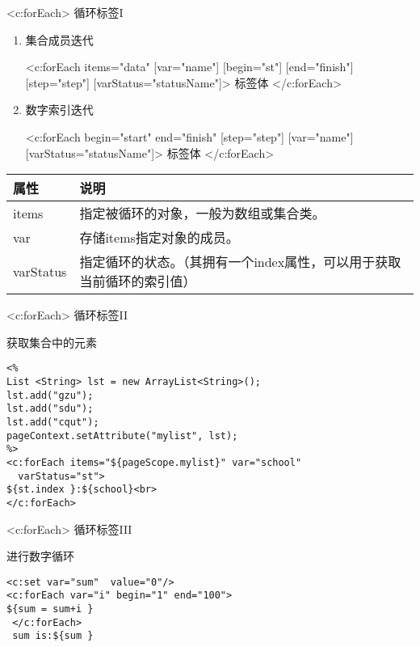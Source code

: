 \documentclass{beamer}
\begin{document}
\begin{frame}{<c:forEach> 循环标签I}
\begin{enumerate}
\item
\label{coll}
集合成员迭代

<c:forEach items="data" [var="name"] [begin="st"] 
 [end="finish"] [step="step"] [varStatus="statusName"]>
 标签体
 </c:forEach>
 \item
 \label{num}
 数字索引迭代
 
 <c:forEach begin="start" end="finish" [step="step"]
  [var="name"] [varStatus="statusName"]>
 标签体
 </c:forEach>

\end{enumerate}
\begin{table}
\begin{tabular}{lp{24em}}
\toprule
\textbf{属性}&\textbf{说明}\\
\midrule
items&指定被循环的对象，一般为数组或集合类。\\
var&存储items指定对象的成员。\\
varStatus&指定循环的状态。（其拥有一个index属性，可以用于获取当前循环的索引值）\\
\bottomrule
\end{tabular}
\end{table}
\end{frame}
\begin{frame}[fragile]{<c:forEach> 循环标签II}
\begin{block}{获取集合中的元素}
\begin{lstlisting}
<%
List <String> lst = new ArrayList<String>();
lst.add("gzu");
lst.add("sdu");
lst.add("cqut");
pageContext.setAttribute("mylist", lst);
%>
<c:forEach items="${pageScope.mylist}" var="school"
  varStatus="st">
${st.index }:${school}<br>
</c:forEach>
\end{lstlisting}
\end{block}
\end{frame}

\begin{frame}[fragile]{<c:forEach> 循环标签III}
\begin{block}{进行数字循环}
\begin{lstlisting}
<c:set var="sum"  value="0"/>
<c:forEach var="i" begin="1" end="100">
${sum = sum+i }
 </c:forEach>
 sum is:${sum }
\end{lstlisting}
\end{block}
\end{frame}
\end{document}

